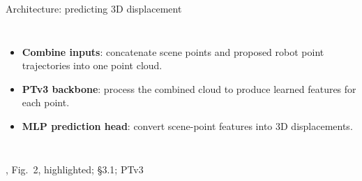 \documentclass[aspectratio=169,12pt]{beamer}
\newcommand{\credit}[1]{\par\hfill{\tiny\color{mute}\citet{huang2026pointworld}, #1}\par}
\begin{document}
\begin{frame}{Architecture: predicting 3D displacement}
  \begin{columns}[c]

      \centering

      \footnotesize
      \begin{itemize}\setlength{\itemsep}{10pt}

        \item<1-> \textbf{Combine inputs}:
          concatenate scene points and proposed robot
          point trajectories into one point cloud.

        \item<2-> \textbf{PTv3 backbone}:
          process the combined cloud to produce
          learned features for each point.

        \item<3-> \textbf{MLP prediction head}:
          convert scene-point features into
          3D displacements.

      \end{itemize}

    
  \end{columns}
  \credit{Fig.~2, highlighted; \S3.1;
    PTv3 \citep{wu2023ptv3}}
\end{frame}
\end{document}
